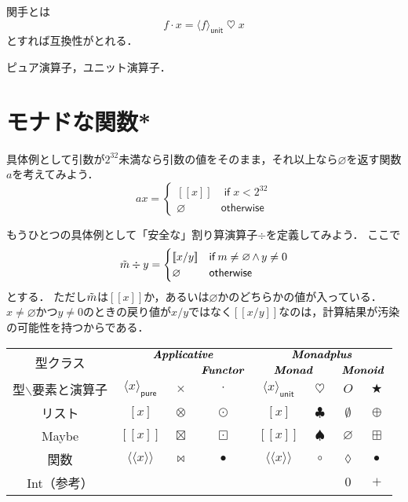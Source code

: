\documentclass[twocolumn]{jsbook}
\def\[{\left[\!\left[}
\def\]{\right]\!\right]}
\newcommand{\hsklTypeClass}[1]{\textbf{\emph{#1}}}
\newcommand{\hsklAppend}{\oplus}
\DeclareMathOperator{\hsklApplicativeMap}{\times}
\DeclareMathOperator{\hsklApplicativeListMap}{\otimes}
\DeclareMathOperator{\hsklApplicativeMaybeMap}{\boxtimes}
\DeclareMathOperator{\hsklFmap}{\cdot}
\DeclareMathOperator{\hsklMap}{\odot}
\DeclareMathOperator{\hsklMaybeAppend}{\boxplus}
\DeclareMathOperator{\hsklMaybeMap}{\boxdot}
\DeclareMathOperator{\hsklMonadMap}{\heartsuit}
\newcommand{\hsklEmptyList}{\emptyset}
\newcommand{\hsklNothing}{\varnothing}
\newcommand{\hsklApplicative}{\hsklTypeClass{Applicative}}
\newcommand{\hsklFunctor}{\hsklTypeClass{Functor}}
\newcommand{\hsklMonad}{\hsklTypeClass{Monad}}
\newcommand{\hsklMonadplus}{\hsklTypeClass{Monadplus}}
\newcommand{\hsklMonoid}{\hsklTypeClass{Monoid}}
\newcommand{\hsklJust}[1]{\[#1\]}
\newcommand{\hsklPure}[1]{\langle#1\rangle_\textsf{pure}}
\newcommand{\hsklUnit}[1]{\langle#1\rangle_\textsf{unit}}
\newcommand{\hsklMaybe}[1]{\Tilde{#1}}
\newcommand{\mathKeyword}[1]{\mathsf{#1}}
\DeclareMathOperator{\mathAnyBinaryOperator}{\bigstar}
\DeclareMathOperator{\mathAnd}{\wedge}
\DeclareMathOperator{\mathCompose}{\bullet}
\DeclareMathOperator{\mathIf}{\mathKeyword{if}}
\newcommand{\mathLambdaAnonymousParameter}{\lozenge}
\newcommand{\mathOtherwise}{\mathKeyword{otherwise}}
\begin{document}
関手とは
$$f\hsklFmap x=\hsklUnit{f}\hsklMonadMap x$$
とすれば互換性がとれる．


ピュア演算子，ユニット演算子．


\section{モナドな関数*}


具体例として引数が$2^{32}$未満なら引数の値をそのまま，それ以上なら$\hsklNothing$を返す関数$a$を考えてみよう．
\begin{equation*}
ax=\begin{cases}
\hsklJust{x}&\mathIf x<2^{32}\\
\hsklNothing&\mathOtherwise
\end{cases}
\end{equation*}


もうひとつの具体例として「安全な」割り算演算子$\div$を定義してみよう．
ここで
\begin{equation*}
\hsklMaybe{m}\div y=\begin{cases}\hsklJust{x/y}&\mathIf m\neq\hsklNothing\mathAnd y\neq0\\
\hsklNothing&\mathOtherwise\end{cases}
\end{equation*}
とする．
ただし$\hsklMaybe{m}$は$\hsklJust{x}$か，あるいは$\hsklNothing$かのどちらかの値が入っている．
$x\neq\hsklNothing$かつ$y\neq0$のときの戻り値が$x/y$ではなく$\hsklJust{x/y}$なのは，計算結果が汚染の可能性を持つからである．


\begin{table*}
\begin{center}
\begin{tabular}{||c||c|c|c|c|c|c|c||}
\hline
\multirow{2}{*}{型クラス}
    &\multicolumn{3}{|c|}{$\hsklApplicative$}
    &\multicolumn{4}{|c||}{$\hsklMonadplus$}\\
\cline{4-8}
\multirow{1}{*}{}
    &\multicolumn{2}{|c|}{ }
    &$\hsklFunctor$
    &\multicolumn{2}{|c}{$\hsklMonad$}
    &\multicolumn{2}{|c||}{$\hsklMonoid$}\\
\hline\hline
型$\backslash$要素と演算子
    &$\hsklPure{x}$
    &$\hsklApplicativeMap$
    &$\hsklFmap$
    &$\hsklUnit{x}$
    &$\hsklMonadMap$
    &$O$
    &$\mathAnyBinaryOperator$\\
\hline
リスト
    &$[x]$
    &$\hsklApplicativeListMap$
    &$\hsklMap$
    &$[x]$
    &$\clubsuit$
    &$\hsklEmptyList$
    &$\hsklAppend$\\
\hline
Maybe
    &$\hsklJust{x}$
    &$\hsklApplicativeMaybeMap$
    &$\hsklMaybeMap$
    &$\hsklJust{x}$
    &$\spadesuit$
    &$\hsklNothing$
    &$\hsklMaybeAppend$\\
\hline
関数
    &$\langle\!\langle x\rangle\!\rangle$
    &$\bowtie$
    &$\mathCompose$
    &$\langle\!\langle x\rangle\!\rangle$
    &$\circ$
    &$\mathLambdaAnonymousParameter$
    &$\mathCompose$\\
\hline
Int（参考）
    &
    &
    &
    &
    &
    &$0$
    &$+$\\
\hline
\end{tabular}
\end{center}
\end{table*}
\end{document}
